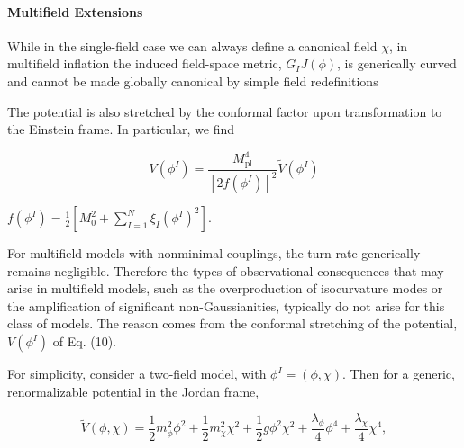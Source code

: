 

\[\]
\paragraph{Multifield Extensions}

While in the single-field case we can always define a  canonical field $\chi$, in multifield inflation the induced field-space metric, $G_IJ(\phi)$, is generically curved and cannot be made globally canonical  by simple field redefinitions \cite{Kaiser2016NMC}




The potential is also stretched by the conformal factor upon transformation to the Einstein frame. In particular, we find

$$
V\left(\phi^I\right)=\frac{M_{\mathrm{pl}}^4}{\left[2 f\left(\phi^I\right)\right]^2} \tilde{V}\left(\phi^I\right)
$$

$f\left(\phi^I\right)=\frac{1}{2}\left[M_0^2+\sum_{I=1}^N \xi_I\left(\phi^I\right)^2\right]$.

For multifield models with nonminimal couplings, the turn rate generically remains negligible. Therefore the types of observational consequences that may arise in multifield models, such as the overproduction of isocurvature modes or the amplification of significant non-Gaussianities, typically do not arise for this class of models. The reason comes from the conformal stretching of the potential, $V\left(\phi^I\right)$ of Eq. (10).

For simplicity, consider a two-field model, with $\phi^I=(\phi, \chi)$. Then for a generic, renormalizable potential in the Jordan frame,

$$
\tilde{V}(\phi, \chi)=\frac{1}{2} m_\phi^2 \phi^2+\frac{1}{2} m_\chi^2 \chi^2+\frac{1}{2} g \phi^2 \chi^2+\frac{\lambda_\phi}{4} \phi^4+\frac{\lambda_\chi}{4} \chi^4,
$$

